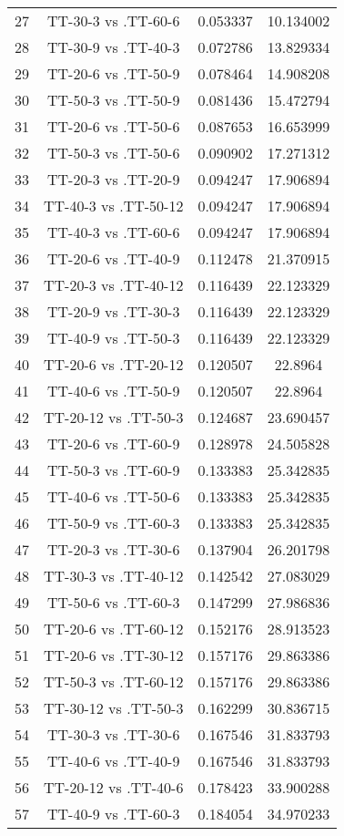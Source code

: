 \documentclass[a4paper,10pt]{article}
\begin{document}
\begin{landscape}
\begin{table}[!htp]
\begin{tabular}{cccc}
27&TT-30-3 vs .TT-60-6&0.053337&10.134002\\
28&TT-30-9 vs .TT-40-3&0.072786&13.829334\\
29&TT-20-6 vs .TT-50-9&0.078464&14.908208\\
30&TT-50-3 vs .TT-50-9&0.081436&15.472794\\
31&TT-20-6 vs .TT-50-6&0.087653&16.653999\\
32&TT-50-3 vs .TT-50-6&0.090902&17.271312\\
33&TT-20-3 vs .TT-20-9&0.094247&17.906894\\
34&TT-40-3 vs .TT-50-12&0.094247&17.906894\\
35&TT-40-3 vs .TT-60-6&0.094247&17.906894\\
36&TT-20-6 vs .TT-40-9&0.112478&21.370915\\
37&TT-20-3 vs .TT-40-12&0.116439&22.123329\\
38&TT-20-9 vs .TT-30-3&0.116439&22.123329\\
39&TT-40-9 vs .TT-50-3&0.116439&22.123329\\
40&TT-20-6 vs .TT-20-12&0.120507&22.8964\\
41&TT-40-6 vs .TT-50-9&0.120507&22.8964\\
42&TT-20-12 vs .TT-50-3&0.124687&23.690457\\
43&TT-20-6 vs .TT-60-9&0.128978&24.505828\\
44&TT-50-3 vs .TT-60-9&0.133383&25.342835\\
45&TT-40-6 vs .TT-50-6&0.133383&25.342835\\
46&TT-50-9 vs .TT-60-3&0.133383&25.342835\\
47&TT-20-3 vs .TT-30-6&0.137904&26.201798\\
48&TT-30-3 vs .TT-40-12&0.142542&27.083029\\
49&TT-50-6 vs .TT-60-3&0.147299&27.986836\\
50&TT-20-6 vs .TT-60-12&0.152176&28.913523\\
51&TT-20-6 vs .TT-30-12&0.157176&29.863386\\
52&TT-50-3 vs .TT-60-12&0.157176&29.863386\\
53&TT-30-12 vs .TT-50-3&0.162299&30.836715\\
54&TT-30-3 vs .TT-30-6&0.167546&31.833793\\
55&TT-40-6 vs .TT-40-9&0.167546&31.833793\\
56&TT-20-12 vs .TT-40-6&0.178423&33.900288\\
57&TT-40-9 vs .TT-60-3&0.184054&34.970233\\

\end{tabular}
\end{table}
\end{landscape}
\end{document}
